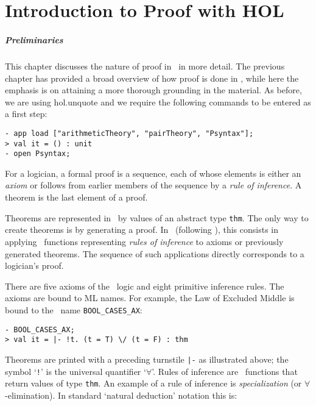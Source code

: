 \chapter{Introduction to Proof with HOL}
\label{proof}

\paragraph{Preliminaries} This chapter discusses the nature of proof
in \HOL\ in more detail.  The previous chapter has provided a broad
overview of how proof is done in \HOL{}, while here the emphasis is on
attaining a more thorough grounding in the material.  As before, we
are using \textsf{hol.unquote} and we require the following commands
to be entered as a first step: \setcounter{sessioncount}{0}
\begin{session}
\begin{verbatim}
- app load ["arithmeticTheory", "pairTheory", "Psyntax"];
> val it = () : unit
- open Psyntax;
\end{verbatim}
\end{session}
\vskip 1cm

\noindent
For a logician, a formal proof is a sequence, each of whose elements
is either an {\it axiom\/} or follows from earlier members of the
sequence by a {\it rule of inference\/}.  A theorem is the last
element of a proof.

Theorems are represented in \HOL\ by values of an abstract type
{\small\verb|thm|}.  The  only way  to create theorems is by generating a
proof.  In \HOL\ (following \LCF), this consists in applying \ML\ functions
representing {\it rules of inference\/} to  axioms or previously generated
theorems.  The sequence of such applications  directly corresponds to a
logician's proof.

There are five axioms of the \HOL\ logic and eight primitive
inference rules. The axioms are bound to ML names. For example, the Law of
Excluded Middle is bound to the \ML\ name {\small\verb|BOOL_CASES_AX|}:

\begin{session}
\begin{verbatim}
- BOOL_CASES_AX;
> val it = |- !t. (t = T) \/ (t = F) : thm
\end{verbatim}
\end{session}

Theorems are printed with a preceding turnstile {\small\verb+|-+} as
illustrated above; the symbol `{\small\verb|!|}' is the universal
quantifier `$\forall$'.  Rules of inference are \ML\ functions that
return values of type {\small\verb|thm|}.  An example of a rule of
inference is {\it specialization\/} (or $\forall$-elimination).  In
standard `natural deduction' notation this is:

